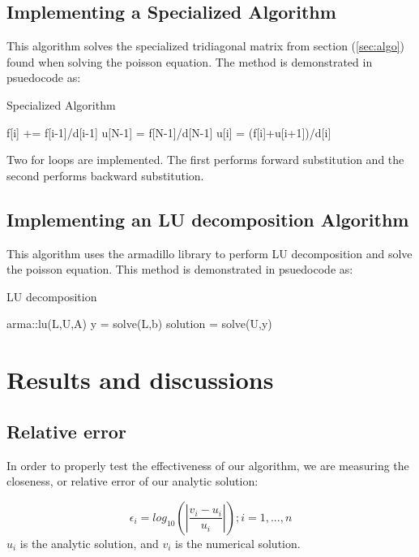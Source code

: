 \documentclass[10pt,showpacs,preprintnumbers,footinbib,amsmath,amssymb,aps,prl,twocolumn,groupedaddress,superscriptaddress,showkeys]{revtex4-1}
\begin{document}
        \subsection{Implementing a Specialized Algorithm}
This algorithm solves the specialized tridiagonal matrix from section (\ref{sec:algo}) found when solving the poisson equation. The method is demonstrated in psuedocode as:
\begin{algorithm}
\caption{Specialized Algorithm}\label{euclid}
\begin{algorithmic}[1]
\Procedure{}{}
\State f[i] += f[i-1]/d[i-1]
\EndFor
\State u[N-1] = f[N-1]/d[N-1]
\State u[i] = (f[i]+u[i+1])/d[i]
\EndFor
\EndProcedure
\end{algorithmic}
\end{algorithm}
Two for loops are implemented. The first performs forward substitution and the second performs backward substitution.

        \subsection{Implementing an LU decomposition Algorithm}
This algorithm uses the armadillo library to perform LU decomposition and solve the poisson equation. This method is demonstrated in psuedocode as:
\begin{algorithm}
\caption{LU decomposition}\label{euclid}
\begin{algorithmic}[1]
\Procedure{}{}
\State arma::lu(L,U,A)
\State y = solve(L,b)
\State solution = solve(U,y)
\EndProcedure
\end{algorithmic}
\end{algorithm}



\section{Results and discussions}

	\subsection{Relative error}

In order to properly test the effectiveness of our algorithm, we are measuring the closeness, or relative error of our analytic solution:

	\begin{equation}
	\epsilon_{i} = log_{10}(|\frac{v_{i}-u_{i}}{u_{i}}|)  ; i = 1,...,n
	\label{error}
	\end{equation}
$u_{i}$ is the analytic solution, and $v_{i}$ is the numerical solution.
\end{document}
